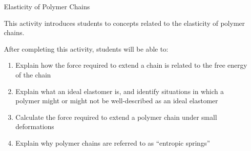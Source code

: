 %
%
%
%

\renewcommand{\figpath}{content/polymphys/chain-confs/chain-elasticity/figs}
\renewcommand{\labelbase}{chain-elasticity}

\begin{activity}{Elasticity of Polymer Chains}

\begin{instructornotes}

	This activity introduces students to concepts related to the elasticity of polymer chains.
	
	After completing this activity, students will be able to:
			\begin{enumerate}
				\item Explain how the force required to extend a chain is related to the free energy of the chain
				\item Explain what an ideal elastomer is, and identify situations in which a polymer might or might not be well-described as an ideal elastomer
				\item Calculate the force required to extend a polymer chain under small deformations
				\item Explain why polymer chains are referred to as ``entropic springs''
			\end{enumerate}
	
			

\end{instructornotes}
\end{activity}

